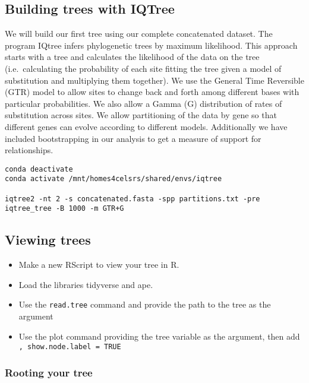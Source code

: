 \documentclass[
]{book}
\providecommand{\tightlist}{%
  \setlength{\itemsep}{0pt}\setlength{\parskip}{0pt}}
\begin{document}
\hypertarget{building-trees-with-iqtree}{%
\subsection{Building trees with IQTree}\label{building-trees-with-iqtree}}

We will build our first tree using our complete concatenated dataset.
The program IQtree infers phylogenetic trees by maximum likelihood.
This approach starts with a tree and calculates the likelihood of the data on the tree (i.e.~calculating the probability of each site fitting the tree given a model of substitution and multiplying them together).
We use the General Time Reversible (GTR) model to allow sites to change back and forth among different bases with particular probabilities.
We also allow a Gamma (G) distribution of rates of substitution across sites.
We allow partitioning of the data by gene so that different genes can evolve according to different models.
Additionally we have included bootstrapping in our analysis to get a measure of support for relationships.

\begin{verbatim}
conda deactivate
conda activate /mnt/homes4celsrs/shared/envs/iqtree

iqtree2 -nt 2 -s concatenated.fasta -spp partitions.txt -pre iqtree_tree -B 1000 -m GTR+G
\end{verbatim}

\hypertarget{viewing-trees}{%
\subsection{Viewing trees}\label{viewing-trees}}

\begin{itemize}
\tightlist
\item
  Make a new RScript to view your tree in R.
\item
  Load the libraries tidyverse and ape.
\item
  Use the \texttt{read.tree} command and provide the path to the tree as the argument
\item
  Use the plot command providing the tree variable as the argument, then add \texttt{,\ show.node.label\ =\ TRUE}
\end{itemize}

\hypertarget{rooting-your-tree}{%
\subsubsection{Rooting your tree}\label{rooting-your-tree}}
\end{document}
